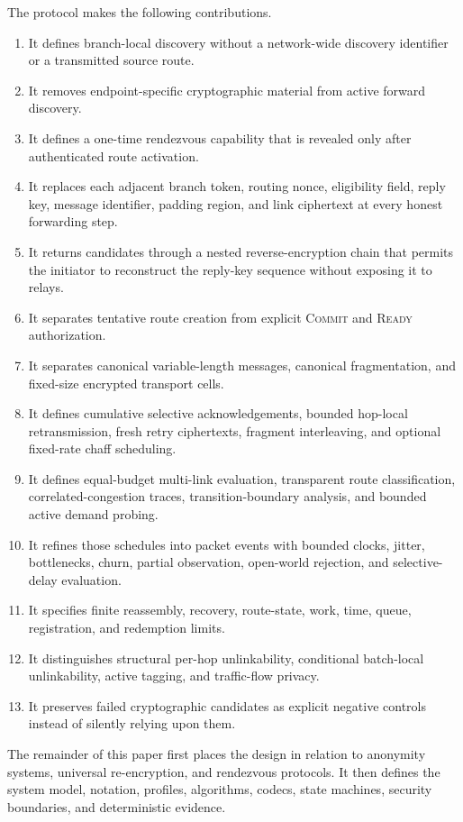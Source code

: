 \documentclass[11pt,oneside]{article}
\begin{document}
The protocol makes the following contributions.

\begin{enumerate}
  \item It defines branch-local discovery without a network-wide discovery identifier or a transmitted source route.
  \item It removes endpoint-specific cryptographic material from active forward discovery.
  \item It defines a one-time rendezvous capability that is revealed only after authenticated route activation.
  \item It replaces each adjacent branch token, routing nonce, eligibility field, reply key, message identifier, padding region, and link ciphertext at every honest forwarding step.
  \item It returns candidates through a nested reverse-encryption chain that permits the initiator to reconstruct the reply-key sequence without exposing it to relays.
  \item It separates tentative route creation from explicit \textsc{Commit} and \textsc{Ready} authorization.
  \item It separates canonical variable-length messages, canonical fragmentation, and fixed-size encrypted transport cells.
  \item It defines cumulative selective acknowledgements, bounded hop-local retransmission, fresh retry ciphertexts, fragment interleaving, and optional fixed-rate chaff scheduling.
  \item It defines equal-budget multi-link evaluation, transparent route classification, correlated-congestion traces, transition-boundary analysis, and bounded active demand probing.
  \item It refines those schedules into packet events with bounded clocks, jitter, bottlenecks, churn, partial observation, open-world rejection, and selective-delay evaluation.
  \item It specifies finite reassembly, recovery, route-state, work, time, queue, registration, and redemption limits.
  \item It distinguishes structural per-hop unlinkability, conditional batch-local unlinkability, active tagging, and traffic-flow privacy.
  \item It preserves failed cryptographic candidates as explicit negative controls instead of silently relying upon them.
\end{enumerate}

The remainder of this paper first places the design in relation to anonymity systems, universal re-encryption, and rendezvous protocols. It then defines the system model, notation, profiles, algorithms, codecs, state machines, security boundaries, and deterministic evidence.
\end{document}
